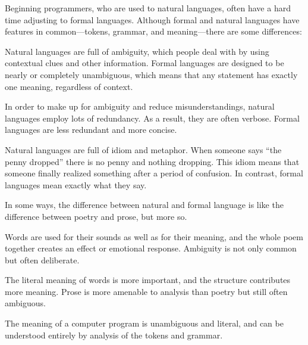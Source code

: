 
Beginning programmers, who are used to natural languages, often have a hard time adjusting to formal languages.
Although formal and natural languages have features in common---tokens, grammar, and meaning---there are some differences:

\begin{description}

Natural languages are full of ambiguity, which people deal with by using contextual clues and other information.
Formal languages are designed to be nearly or completely unambiguous, which means that any statement has exactly one meaning, regardless of context.

In order to make up for ambiguity and reduce misunderstandings, natural languages employ lots of redundancy.
As a result, they are often verbose.
Formal languages are less redundant and more concise.

Natural languages are full of idiom and metaphor.
When someone says ``the penny dropped'' there is no penny and nothing dropping.
This idiom means that someone finally realized something after a period of confusion.
In contrast, formal languages mean exactly what they say.

\end{description}

In some ways, the difference between natural and formal language is like the difference between poetry and prose, but more so.

\begin{description}

Words are used for their sounds as well as for their meaning, and the whole poem together creates an effect or emotional response.
Ambiguity is not only common but often deliberate.

The literal meaning of words is more important, and the structure contributes more meaning.
Prose is more amenable to analysis than poetry but still often ambiguous.

The meaning of a computer program is unambiguous and literal, and can be understood entirely by analysis of the tokens and grammar.

\end{description}

